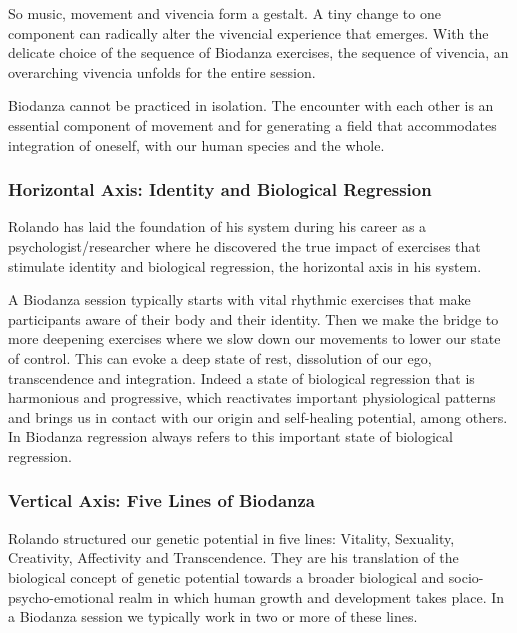 \documentclass[
  11pt,
]{book}
\begin{document}
So music, movement and vivencia form a gestalt. A tiny change to one component can radically alter the vivencial experience that emerges.
With the delicate choice of the sequence of Biodanza exercises, the sequence of vivencia, an overarching vivencia unfolds for the entire session.

Biodanza cannot be practiced in isolation. The encounter with each other is an essential component of movement and for generating a field that accommodates integration of oneself, with our human species and the whole.

\hypertarget{horizontal-axis-identity-and-biological-regression}{%
\subsubsection{Horizontal Axis: Identity and Biological Regression}\label{horizontal-axis-identity-and-biological-regression}}

Rolando has laid the foundation of his system during his career as a psychologist/researcher where he discovered the true impact of exercises that stimulate identity and biological regression, the horizontal axis in his system.

A Biodanza session typically starts with vital rhythmic exercises that make participants aware of their body and their identity.
Then we make the bridge to more deepening exercises where we slow down our movements to lower our state of control. This can evoke a deep state of rest, dissolution of our ego, transcendence and integration. Indeed a state of biological regression that is harmonious and progressive, which reactivates important physiological patterns and brings us in contact with our origin and self-healing potential, among others. In Biodanza regression always refers to this important state of biological regression.

\hypertarget{vertical-axis-five-lines-of-biodanza}{%
\subsubsection{Vertical Axis: Five Lines of Biodanza}\label{vertical-axis-five-lines-of-biodanza}}

Rolando structured our genetic potential in five lines: Vitality, Sexuality, Creativity, Affectivity and Transcendence. They are his translation of the biological concept of genetic potential towards a broader biological and socio-psycho-emotional realm in which human growth and development takes place.
In a Biodanza session we typically work in two or more of these lines.
\end{document}
